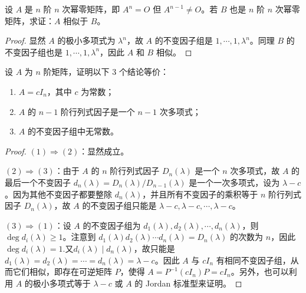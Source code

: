 \documentclass[../../main.tex]{subfiles}
\begin{document}
\begin{proposition}[同阶幂零阵必相似]\label{proposition:同阶幂零阵必相似}
设 \(A\) 是 \(n\) 阶 \(n\) 次幂零矩阵，即 \(A^n = O\) 但 \(A^{n - 1}\neq O\)。若 \(B\) 也是 \(n\) 阶 \(n\) 次幂零矩阵，求证：\(A\) 相似于 \(B\)。
\end{proposition}
\begin{proof}
显然 \(A\) 的极小多项式为 \(\lambda^n\)，故 \(A\) 的不变因子组是 \(1,\cdots,1,\lambda^n\)。同理 \(B\) 的不变因子组也是 \(1,\cdots,1,\lambda^n\)，因此 \(A\) 和 \(B\) 相似。
\end{proof}

\begin{proposition}\label{proposition:纯量阵关于不变因子和行列式因子的等价条件}
设 \(A\) 为 \(n\) 阶矩阵，证明以下 3 个结论等价：
\begin{enumerate}[(1)]
\item  \(A = cI_n\)，其中 \(c\) 为常数；

\item  \(A\) 的 \(n - 1\) 阶行列式因子是一个 \(n - 1\) 次多项式；

\item \(A\) 的不变因子组中无常数。
\end{enumerate}
\end{proposition}
\begin{proof}
\((1)\Rightarrow(2)\)：显然成立。

\((2)\Rightarrow(3)\)：由于 \(A\) 的 \(n\) 阶行列式因子 \(D_n(\lambda)\) 是一个 \(n\) 次多项式，故 \(A\) 的最后一个不变因子 \(d_n(\lambda)=D_n(\lambda)/D_{n - 1}(\lambda)\) 是一个一次多项式，设为 \(\lambda - c\)。因为其他不变因子都要整除 \(d_n(\lambda)\)，并且所有不变因子的乘积等于 \(n\) 阶行列式因子 \(D_n(\lambda)\)，故 \(A\) 的不变因子组只能是 \(\lambda - c,\lambda - c,\cdots,\lambda - c\)。 

\((3)\Rightarrow(1)\)：设 \(A\) 的不变因子组为 \(d_1(\lambda),d_2(\lambda),\cdots,d_n(\lambda)\)，则 \(\deg d_i(\lambda)\geq1\)。注意到 \(d_1(\lambda)d_2(\lambda)\cdots d_n(\lambda)=D_n(\lambda)\) 的次数为 \(n\)，因此$\deg d_i(\lambda)=1$.又\(d_i(\lambda)\mid d_n(\lambda)\)，故只能是 \(d_1(\lambda)=d_2(\lambda)=\cdots=d_n(\lambda)=\lambda - c\)。因此 \(A\) 与 \(cI_n\) 有相同不变因子组，从而它们相似，即存在可逆矩阵 \(P\)，使得 \(A = P^{-1}(cI_n)P = cI_n\)。另外，也可以利用 \(A\) 的极小多项式等于 \(\lambda - c\) 或 \(A\) 的 Jordan 标准型来证明。
\end{proof}
\end{document}
